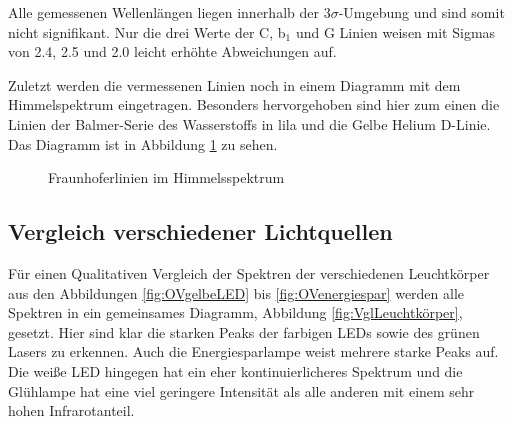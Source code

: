 \documentclass{article}
\begin{document}
\phantom{.}

Alle gemessenen Wellenlängen liegen innerhalb der $3\sigma$-Umgebung und sind somit nicht signifikant. Nur die drei Werte der C, b$_1$ und G Linien weisen mit Sigmas von 2.4, 2.5 und 2.0 leicht erhöhte Abweichungen auf.

Zuletzt werden die vermessenen Linien noch in einem Diagramm mit dem Himmelspektrum eingetragen. Besonders hervorgehoben sind hier zum einen die Linien der Balmer-Serie des Wasserstoffs in lila und die Gelbe Helium D-Linie. Das Diagramm ist in Abbildung \ref{fig:HimmelMitLinien} zu sehen.

\begin{figure}[!h]
    \centering
    \caption{Fraunhoferlinien im Himmelsspektrum}
    \label{fig:HimmelMitLinien}
\end{figure}
\clearpage

\newpage

\subsection{Vergleich verschiedener Lichtquellen}

Für einen Qualitativen Vergleich der Spektren der verschiedenen Leuchtkörper aus den Abbildungen \ref{fig:OVgelbeLED} bis \ref{fig:OVenergiespar} werden alle Spektren in ein gemeinsames Diagramm, Abbildung \ref{fig:VglLeuchtkörper}, gesetzt. Hier sind klar die starken Peaks der farbigen LEDs sowie des grünen Lasers zu erkennen. Auch die Energiesparlampe weist mehrere starke Peaks auf. Die weiße LED hingegen hat ein eher kontinuierlicheres Spektrum und die Glühlampe hat eine viel geringere Intensität als alle anderen mit einem sehr hohen Infrarotanteil. 
\end{document}
